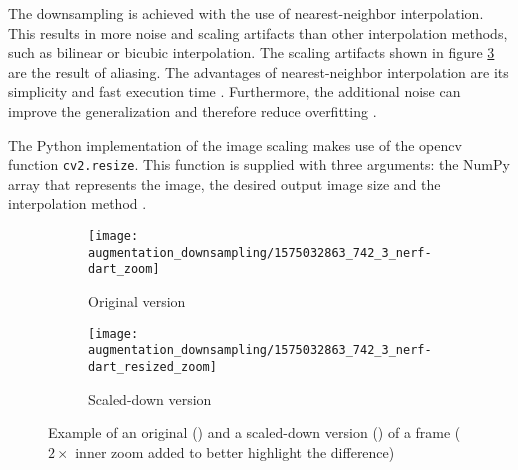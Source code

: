The downsampling is achieved with the use of nearest-neighbor interpolation.
This results in more noise and scaling artifacts than other interpolation methods, such as bilinear or bicubic interpolation.
The scaling artifacts shown in figure \ref{fig:augmentation_downsampling} are the result of aliasing.
The advantages of nearest-neighbor interpolation are its simplicity and fast execution time \cite{}. %
Furthermore, the additional noise can improve the generalization and therefore reduce overfitting \cite{}. %

The Python implementation of the image scaling makes use of the \acrshort{opencv} function \texttt{cv2.resize}.
This function is supplied with three arguments: the NumPy array that represents the image, the desired output image size and the interpolation method \cite{}. %


\begin{figure}
  \centering
  \begin{subfigure}[b]{0.45\textwidth}
    \centering
    \texttt{[image: augmentation\_downsampling/1575032863\_742\_3\_nerf-dart\_zoom]}
    \caption{Original version}
    \label{subfig:ad_original}
  \end{subfigure}
  \begin{subfigure}[b]{0.45\textwidth}
    \centering
    \texttt{[image: augmentation\_downsampling/1575032863\_742\_3\_nerf-dart\_resized\_zoom]}
    \caption{Scaled-down version}
    \label{subfig:ad_resized}
  \end{subfigure}
  \caption{Example of an original () and a scaled-down version () of a frame ($2\times$ inner zoom added to better highlight the difference)}
  \label{fig:augmentation_downsampling}
\end{figure}

